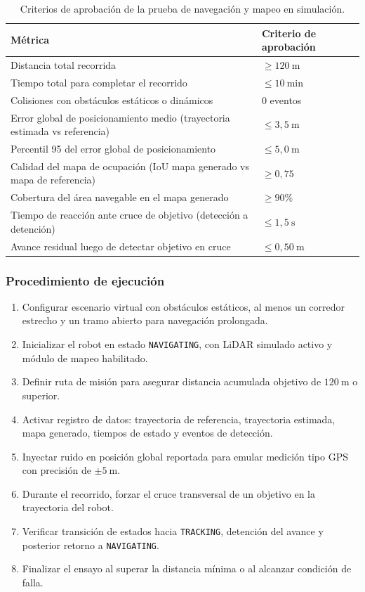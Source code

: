 \begin{table}[H]
\centering
\small
\begin{tabular}{p{8.8cm} p{4.1cm}}
\toprule
\textbf{Métrica} & \textbf{Criterio de aprobación} \\
\midrule
Distancia total recorrida & $\geq 120\ \text{m}$ \\
Tiempo total para completar el recorrido & $\leq 10\ \text{min}$ \\
Colisiones con obstáculos estáticos o dinámicos & 0 eventos \\
Error global de posicionamiento medio (trayectoria estimada vs referencia) & $\leq 3{,}5\ \text{m}$ \\
Percentil 95 del error global de posicionamiento & $\leq 5{,}0\ \text{m}$ \\
Calidad del mapa de ocupación (IoU mapa generado vs mapa de referencia) & $\geq 0{,}75$ \\
Cobertura del área navegable en el mapa generado & $\geq 90\%$ \\
Tiempo de reacción ante cruce de objetivo (detección a detención) & $\leq 1{,}5\ \text{s}$ \\
Avance residual luego de detectar objetivo en cruce & $\leq 0{,}50\ \text{m}$ \\
\bottomrule
\end{tabular}
\caption{Criterios de aprobación de la prueba de navegación y mapeo en simulación.}
\label{tab:criterios_prueba_navegacion}
\end{table}

\subsubsection{Procedimiento de ejecución}

\begin{enumerate}
    \item Configurar escenario virtual con obstáculos estáticos, al menos un corredor estrecho y un tramo abierto para navegación prolongada.
    \item Inicializar el robot en estado \texttt{NAVIGATING}, con LiDAR simulado activo y módulo de mapeo habilitado.
    \item Definir ruta de misión para asegurar distancia acumulada objetivo de $120\ \text{m}$ o superior.
    \item Activar registro de datos: trayectoria de referencia, trayectoria estimada, mapa generado, tiempos de estado y eventos de detección.
    \item Inyectar ruido en posición global reportada para emular medición tipo GPS con precisión de $\pm 5\ \text{m}$.
    \item Durante el recorrido, forzar el cruce transversal de un objetivo en la trayectoria del robot.
    \item Verificar transición de estados hacia \texttt{TRACKING}, detención del avance y posterior retorno a \texttt{NAVIGATING}.
    \item Finalizar el ensayo al superar la distancia mínima o al alcanzar condición de falla.
\end{enumerate}

